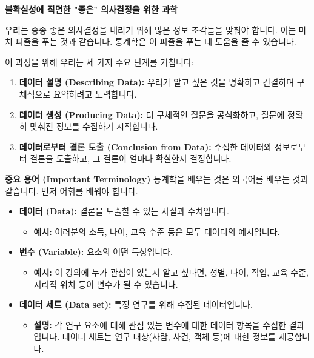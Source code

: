 \documentclass[11pt,a4paper]{article}
\theoremstyle{definition}
\begin{document}
\begin{tcolorbox}[title={비즈니스 통계학 (Business Statistics)}]
\textbf{불확실성에 직면한 "좋은" 의사결정을 위한 과학}

우리는 종종 좋은 의사결정을 내리기 위해 많은 정보 조각들을 맞춰야 합니다. 이는 마치 퍼즐을 푸는 것과 같습니다. 통계학은 이 퍼즐을 푸는 데 도움을 줄 수 있습니다.

\begin{center}
\label{fig:puzzle}
\end{center}

이 과정을 위해 우리는 세 가지 주요 단계를 거칩니다:
\begin{enumerate}
    \item \textbf{데이터 설명 (Describing Data):} 우리가 알고 싶은 것을 명확하고 간결하며 구체적으로 요약하려고 노력합니다.
    \item \textbf{데이터 생성 (Producing Data):} 더 구체적인 질문을 공식화하고, 질문에 정확히 맞춰진 정보를 수집하기 시작합니다.
    \item \textbf{데이터로부터 결론 도출 (Conclusion from Data):} 수집한 데이터와 정보로부터 결론을 도출하고, 그 결론이 얼마나 확실한지 결정합니다.
\end{enumerate}
\end{tcolorbox}

\begin{summarybox}
\textbf{중요 용어 (Important Terminology)}
통계학을 배우는 것은 외국어를 배우는 것과 같습니다. 먼저 어휘를 배워야 합니다.
\begin{itemize}
    \item \textbf{데이터 (Data):} 결론을 도출할 수 있는 사실과 수치입니다.
    \begin{itemize}
        \item \textbf{예시:} 여러분의 소득, 나이, 교육 수준 등은 모두 데이터의 예시입니다.
    \end{itemize}
    \item \textbf{변수 (Variable):} 요소의 어떤 특성입니다.
    \begin{itemize}
        \item \textbf{예시:} 이 강의에 누가 관심이 있는지 알고 싶다면, 성별, 나이, 직업, 교육 수준, 지리적 위치 등이 변수가 될 수 있습니다.
    \end{itemize}
    \item \textbf{데이터 세트 (Data set):} 특정 연구를 위해 수집된 데이터입니다.
    \begin{itemize}
        \item \textbf{설명:} 각 연구 요소에 대해 관심 있는 변수에 대한 데이터 항목을 수집한 결과입니다. 데이터 세트는 연구 대상(사람, 사건, 객체 등)에 대한 정보를 제공합니다.
    \end{itemize}
\end{itemize}
\end{summarybox}
\end{document}
